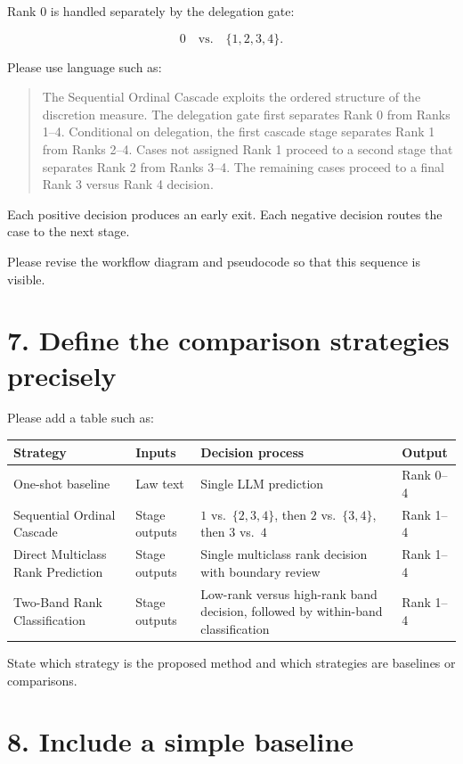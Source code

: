 \documentclass[11pt]{article}
\begin{document}
Rank 0 is handled separately by the delegation gate:

\[
0 \quad \text{vs.} \quad \{1,2,3,4\}.
\]

Please use language such as:

\begin{quote}
The Sequential Ordinal Cascade exploits the ordered structure of the discretion measure. The delegation gate first separates Rank 0 from Ranks 1--4. Conditional on delegation, the first cascade stage separates Rank 1 from Ranks 2--4. Cases not assigned Rank 1 proceed to a second stage that separates Rank 2 from Ranks 3--4. The remaining cases proceed to a final Rank 3 versus Rank 4 decision.
\end{quote}

Each positive decision produces an early exit. Each negative decision routes the case to the next stage.

Please revise the workflow diagram and pseudocode so that this sequence is visible.

\section*{7. Define the comparison strategies precisely}

Please add a table such as:

\begin{center}
\small
\begin{tabularx}{\textwidth}{@{}lXXX@{}}
\toprule
\textbf{Strategy} & \textbf{Inputs} & \textbf{Decision process} & \textbf{Output} \\
\midrule
One-shot baseline & Law text & Single LLM prediction & Rank 0--4 \\
Sequential Ordinal Cascade & Stage outputs & \(1\) vs.\ \(\{2,3,4\}\), then \(2\) vs.\ \(\{3,4\}\), then \(3\) vs.\ \(4\) & Rank 1--4 \\
Direct Multiclass Rank Prediction & Stage outputs & Single multiclass rank decision with boundary review & Rank 1--4 \\
Two-Band Rank Classification & Stage outputs & Low-rank versus high-rank band decision, followed by within-band classification & Rank 1--4 \\
\bottomrule
\end{tabularx}
\end{center}

State which strategy is the proposed method and which strategies are baselines or comparisons.

\section*{8. Include a simple baseline}
\end{document}
